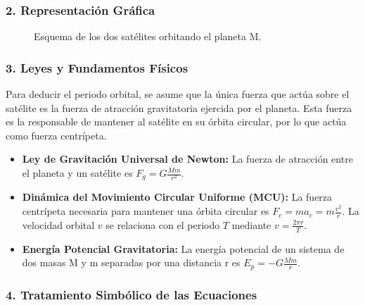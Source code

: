 \subsubsection*{2. Representación Gráfica}
\begin{figure}[H]
    \centering
    \caption{Esquema de los dos satélites orbitando el planeta M.}
\end{figure}

\subsubsection*{3. Leyes y Fundamentos Físicos}
Para deducir el periodo orbital, se asume que la única fuerza que actúa sobre el satélite es la fuerza de atracción gravitatoria ejercida por el planeta. Esta fuerza es la responsable de mantener al satélite en su órbita circular, por lo que actúa como fuerza centrípeta.
\begin{itemize}
    \item \textbf{Ley de Gravitación Universal de Newton:} La fuerza de atracción entre el planeta y un satélite es $F_g = G \frac{M m}{r^2}$.
    \item \textbf{Dinámica del Movimiento Circular Uniforme (MCU):} La fuerza centrípeta necesaria para mantener una órbita circular es $F_c = m a_c = m \frac{v^2}{r}$. La velocidad orbital $v$ se relaciona con el periodo $T$ mediante $v = \frac{2\pi r}{T}$.
    \item \textbf{Energía Potencial Gravitatoria:} La energía potencial de un sistema de dos masas M y m separadas por una distancia r es $E_p = -G \frac{M m}{r}$.
\end{itemize}

\subsubsection*{4. Tratamiento Simbólico de las Ecuaciones}
